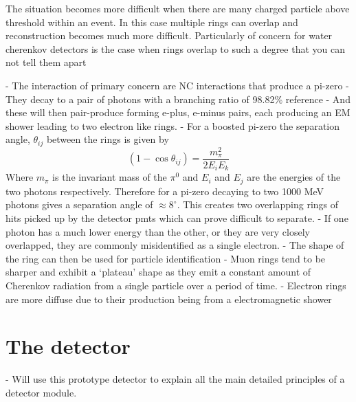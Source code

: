 The situation becomes more difficult when there are many charged particle above threshold within
an event. In this case multiple rings can overlap and reconstruction becomes much more difficult.
Particularly of concern for water cherenkov detectors is the case when rings overlap to such a
degree that you can not tell them apart

- The interaction of primary concern are NC interactions that produce a pi-zero
- They decay to a pair of photons with a branching ratio of 98.82\% reference
- And these will then pair-produce forming e-plus, e-minus pairs, each producing an EM shower
leading to two electron like rings.
- For a boosted pi-zero the separation angle, $\theta_{ij}$ between the rings is given by
\begin{equation}
    (1-\cos\theta_{ij})=\frac{m_{\pi}^2}{2E_{i}E_{k}}
\end{equation}
Where $m_{\pi}$ is the invariant mass of the $\pi^{0}$ and $E_{i}$ and $E_{j}$ are the energies
of the two photons respectively.
Therefore for a pi-zero decaying to two 1000 MeV photons gives a separation angle of
$\approx 8^{\circ}$. This creates two overlapping rings of hits picked up by the detector pmts
which can prove difficult to separate.
- If one photon has a much lower energy than the other, or they are very closely overlapped,
they are commonly misidentified as a single electron.
- The shape of the ring can then be used for particle identification
- Muon rings tend to be sharper and exhibit a `plateau' shape as they emit a constant amount of
Cherenkov radiation from a single particle over a period of time.
- Electron rings are more diffuse due to their production being from a electromagnetic shower

\section{The \chipsfive detector} %
\label{sec:chips_detector} %

- Will use this prototype detector to explain all the main detailed principles of a \chips
detector module.

